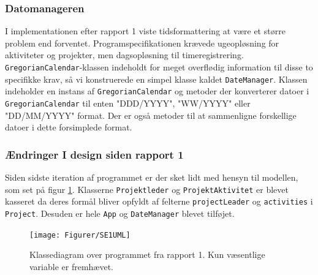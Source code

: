 \subsubsection{Datomanageren}
\label{datomanager}
I implementationen efter rapport 1 viste tidsformattering at være et større problem end forventet. Programspecifikationen krævede ugeopløsning for aktiviteter og projekter, men dagsopløsning til timeregistrering. \texttt{GregorianCalendar}-klassen indeholdt for meget overflødig information til disse to specifikke krav, så vi konstruerede en simpel klasse kaldet \texttt{DateManager}. Klassen indeholder en instans af \texttt{GregorianCalendar} og metoder der konverterer datoer i \texttt{GregorianCalendar} til enten "DDD/YYYY", "WW/YYYY" eller "DD/MM/YYYY" format. Der er også metoder til at sammenligne forskellige datoer i dette forsimplede format. 


\subsubsection{Ændringer I design siden rapport 1}

Siden sidste iteration af programmet er der sket lidt med hensyn til modellen, som set på figur \ref{fig:SE1UML}. Klasserne \texttt{Projektleder} og \texttt{ProjektAktivitet} er blevet kasseret da deres formål bliver opfyldt af felterne \texttt{projectLeader} og \texttt{activities} i \texttt{Project}. Desuden er hele \texttt{App} og \texttt{DateManager} blevet tilføjet.

\label{aendringer}
\begin{figure}[H]
    \centering
    \texttt{[image: Figurer/SE1UML]}
    \caption{Klassediagram over programmet fra rapport 1. Kun væsentlige variable er fremhævet.}
    \label{fig:SE1UML}
\end{figure} 



